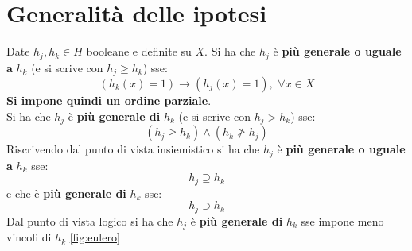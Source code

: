 \section{Generalità delle ipotesi}
\begin{definizione}
  Date $h_j, h_k\in H$ booleane e definite su $X$. Si ha che $h_j$ è \textbf{più
    generale o uguale a} $h_k$ (e si scrive con $h_j\geq h_k$) sse:
  \[(h_k(x)=1)\longrightarrow (h_j(x)=1),\,\,\forall x\in X\]
  \textbf{Si impone quindi un ordine parziale}.\\
  Si ha che $h_j$ è \textbf{più generale di} $h_k$ (e si scrive con $h_j> h_k$)
  sse:
  \[(h_j\geq h_k)\land (h_k\not\geq h_j)\]
  Riscrivendo dal punto di vista insiemistico si ha che $h_j$ è \textbf{più
    generale o uguale a} $h_k$ sse:
  \[h_j\supseteq h_k\]
  e che è \textbf{più generale di} $h_k$ sse:
  \[h_j\supset h_k\]
  Dal punto di vista logico si ha che $h_j$ è \textbf{più generale di} $h_k$ sse
  impone meno vincoli di $h_k$ \ref{fig:eulero}
\end{definizione}
